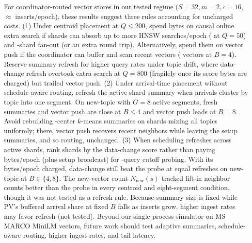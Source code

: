For coordinator-routed vector stores in our tested regime ($S = 32, m = 2, c = 16$, $\approx {}$\RNumSteadyEpochInsertVecs{} inserts/epoch), these results suggest three rules accounting for uncharged costs. (1) Under centroid placement at $Q \le 200$, spend bytes on causal online extra search if shards can absorb up to \RNumExtraSearchesBFour{} more HNSW searches/epoch (\RNumESOQFiftyMaxSearches{} at $Q = 50$) and \RNumThreeShards{}-shard fan-out (or an extra round trip). Alternatively, spend them on vector push if the coordinator can buffer and scan recent vectors (\RNumPVMaxVecsBFour{} vectors at $B = 4$). Reserve summary refresh for higher query rates under topic drift, where data-change refresh overtook extra search at $Q = 800$ (fragilely once its score bytes are charged) but trailed vector push. (2) Under arrival-time placement without schedule-aware routing, refresh the active shard summary when arrivals cluster by topic into one segment. On new-topic with $G = 8$ active segments, fresh summaries and vector push are close at $B \le 4$ and vector push leads at $B = 8$. Avoid rebuilding \RNumCentersPerSummary{}-center $k$-means summaries on shards mixing all topics uniformly; there, vector push recovers recent neighbors while leaving the setup summaries, and so routing, unchanged. (3) When scheduling refreshes across active shards, rank shards by the data-change score rather than paying \RNumRNOverheadEpochBytes{} bytes/epoch (plus setup broadcast) for \RNumSampleQueries{}-query cutoff probing. With its \RNumDCScoreEpochBytes{} bytes/epoch charged, data-change still beat the probe at equal refreshes on new-topic at $B \in \{4, 8\}$. The new-vector count $N_{\text{new}}(s)$ tracked lift-in neighbor counts better than the probe in every centroid and eight-segment condition, though it was not tested as a refresh rule. Because summary size is fixed while PV's buffered arrival share at fixed $B$ falls as inserts grow, higher ingest rates may favor refresh (not tested). Beyond our single-process simulator on \RNumCorpusTotalPassages{} MS MARCO MiniLM vectors, future work should test adaptive summaries, schedule-aware routing, higher ingest rates, and tail latency.
